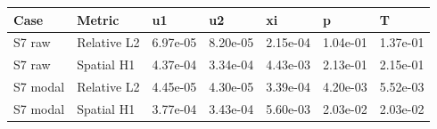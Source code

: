 \begin{tabular}{lllllll}
\hline
Case & Metric & u1 & u2 & xi & p & T \\
\hline
S7 raw & Relative L2 & 6.97e-05 & 8.20e-05 & 2.15e-04 & 1.04e-01 & 1.37e-01 \\
S7 raw & Spatial H1 & 4.37e-04 & 3.34e-04 & 4.43e-03 & 2.13e-01 & 2.15e-01 \\
S7 modal & Relative L2 & 4.45e-05 & 4.30e-05 & 3.39e-04 & 4.20e-03 & 5.52e-03 \\
S7 modal & Spatial H1 & 3.77e-04 & 3.43e-04 & 5.60e-03 & 2.03e-02 & 2.03e-02 \\
\hline
\end{tabular}
